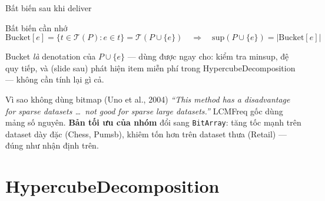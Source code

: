 \documentclass[9pt, aspectratio=169]{beamer}
\newcommand{\opt}[1]{\textcolor{optgreen}{\textbf{#1}}}
\begin{document}
\begin{frame}{Bất biến sau khi deliver}
  \begin{block}{Bất biến cần nhớ}
    \begin{equation}
      \mathrm{Bucket}[e]=\{t\in\mathcal T(P): e\in t\}=\mathcal T(P\cup\{e\})
      \quad\Rightarrow\quad
      \mathrm{sup}(P\cup\{e\})=|\mathrm{Bucket}[e]|
    \end{equation}
  \end{block}
  \small Bucket \emph{là} denotation của $P\cup\{e\}$ — dùng được ngay cho:
  kiểm tra minsup, đệ quy tiếp, và (slide sau) phát hiện item miễn phí trong
  HypercubeDecomposition — không cần tính lại gì cả.

  \vspace{0.5em}
  \begin{exampleblock}{Vì sao không dùng bitmap (Uno et al., 2004)}
    \small\textit{``This method has a disadvantage for sparse datasets \dots\
    not good for sparse large datasets.''} LCMFreq gốc dùng mảng số nguyên.
    \opt{Bản tối ưu của nhóm} đổi sang \texttt{BitArray}: tăng tốc mạnh trên
    dataset dày đặc (Chess, Pumsb), khiêm tốn hơn trên dataset thưa (Retail)
    — đúng như nhận định trên.
  \end{exampleblock}
\end{frame}

\section{HypercubeDecomposition}
\end{document}
